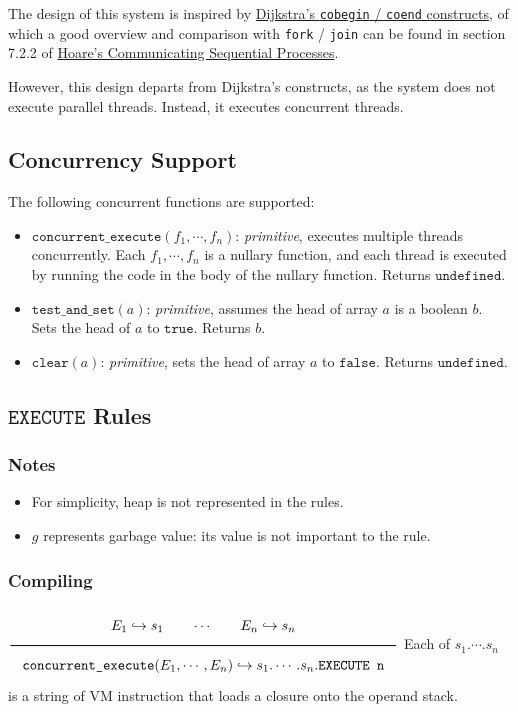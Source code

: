 The design of this system is inspired by \href{https://doi.org/10.1007/978-1-4757-3472-0\_2}{Dijkstra's \texttt{cobegin} / \texttt{coend} constructs}, of which a good overview and comparison with \texttt{fork} / \texttt{join} can be found in section 7.2.2 of \href{https://doi.org/10.1145/359576.359585}{Hoare's Communicating Sequential Processes}.

However, this design departs from Dijkstra's constructs, as the system does not execute parallel threads. Instead, it executes concurrent threads.

\subsection{Concurrency Support}
\label{sec:orga25444d}
The following concurrent functions are supported:
\begin{itemize}
\item \(\texttt{concurrent\_execute}(f_1, \cdots ,f_n)\): \textit{primitive}, executes multiple threads concurrently. Each \(f_1, \cdots ,f_n\) is a nullary function, and each thread is executed by running the code in the body of the nullary function. Returns \(\texttt{undefined}\).
\item \(\texttt{test\_and\_set}(a)\): \textit{primitive}, assumes the head of array \(a\) is a boolean \(b\). Sets the head of \(a\) to \(\texttt{true}\). Returns \(b\).
\item \(\texttt{clear}(a)\): \textit{primitive}, sets the head of array \(a\) to \(\texttt{false}\). Returns \(\texttt{undefined}\).
\end{itemize}

\subsection{\(\texttt{EXECUTE}\) Rules}
\label{sec:orga76ff96}

\subsubsection{Notes}
\label{sec:org406dee3}
\begin{itemize}
\item For simplicity, heap is not represented in the rules.
\item \(g\) represents garbage value: its value is not important to the rule.
\end{itemize}

\subsubsection{Compiling}
\label{sec:org536d6c2}
\(\Rule{E_1 \translateaux s_1 \qquad \cdots \qquad E_n \translateaux s_n}{\texttt{concurrent\_execute}(E_1, \cdots , E_n) \translateaux s_1. \cdots .s_n.\texttt{EXECUTE n}}\\\)
Each of \(s_1. \cdots .s_n\) is a string of VM instruction that loads a closure onto the operand stack.

